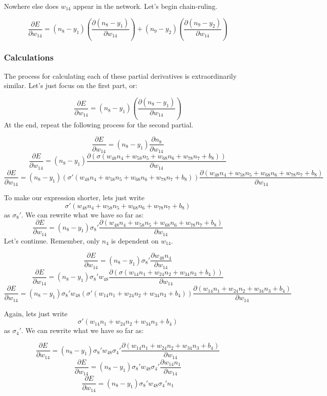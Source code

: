 \documentclass{article}
\begin{document}
Nowhere else does $w_{14}$ appear in the network. Let's begin chain-ruling.

\[\dfrac{\partial E}{\partial w_{14}} = (n_8-y_1)\left(\frac{\partial{(n_8-y_1)}}{\partial w_{14}}\right)+(n_9-y_2)\left(\frac{\partial{(n_9-y_2)}}{\partial w_{14}}\right)\]

\subsubsection{Calculations}

The process for calculating each of these partial derivatives is extraordinarily similar. Let's just focus on the first part, or:

\[\dfrac{\partial E}{\partial w_{14}} = (n_8-y_1)\left(\frac{\partial{(n_8-y_1)}}{\partial w_{14}}\right)\]
At the end, repeat the following process for the second partial.


\[\dfrac{\partial E}{\partial w_{14}} = (n_8-y_1)\frac{\partial{n_8}}{\partial w_{14}}\]
\[\dfrac{\partial E}{\partial w_{14}} = (n_8-y_1)\frac{\partial{(\sigma(w_{48}n_4 + w_{58}n_5 + w_{68}n_6 + w_{78}n_7 + b_8))}}{\partial w_{14}}\]
\[\dfrac{\partial E}{\partial w_{14}} = (n_8-y_1)\left(\sigma'(w_{48}n_4 + w_{58}n_5 + w_{68}n_6 + w_{78}n_7 + b_8)\right)\frac{\partial{(w_{48}n_4 + w_{58}n_5 + w_{68}n_6 + w_{78}n_7 + b_8)}}{\partial w_{14}}\]

To make our expression shorter, lets just write
\[\sigma'(w_{48}n_4 + w_{58}n_5 + w_{68}n_6 + w_{78}n_7 + b_8)\]
as $\sigma_8'$. We can rewrite what we have so far as:
\[\dfrac{\partial E}{\partial w_{14}} = (n_8-y_1)\sigma_8'\frac{\partial{(w_{48}n_4 + w_{58}n_5 + w_{68}n_6 + w_{78}n_7 + b_8)}}{\partial w_{14}}\]
Let's continue. Remember, only $n_4$ is dependent on $w_{14}$.

\[\dfrac{\partial E}{\partial w_{14}} = (n_8-y_1)\sigma_8'\frac{\partial{w_{48}n_4}}{\partial w_{14}}\]
\[\dfrac{\partial E}{\partial w_{14}} = (n_8-y_1)\sigma_8'w_{48}\frac{\partial{(\sigma(w_{14}n_1 + w_{24}n_2 + w_{34}n_3 + b_4))}}{\partial w_{14}}\]
\[\dfrac{\partial E}{\partial w_{14}} = (n_8-y_1)\sigma_8'w_{48}(\sigma'(w_{14}n_1 + w_{24}n_2 + w_{34}n_3 + b_4))\frac{\partial{(w_{14}n_1 + w_{24}n_2 + w_{34}n_3 +b_4)}}{\partial w_{14}}\]

Again, lets just write
\[\sigma'(w_{14}n_1 + w_{24}n_2 + w_{34}n_3 + b_4)\]
as $\sigma_4'$. We can rewrite what we have so far as:

\[\dfrac{\partial E}{\partial w_{14}} = (n_8-y_1)\sigma_8'w_{48}\sigma_4'\frac{\partial{(w_{14}n_1 + w_{24}n_2 + w_{34}n_3 + b_4)}}{\partial w_{14}}\]
\[\dfrac{\partial E}{\partial w_{14}} = (n_8-y_1)\sigma_8'w_{48}\sigma_4'\frac{\partial{w_{14}n_1}}{\partial w_{14}}\]
\[\dfrac{\partial E}{\partial w_{14}} = (n_8-y_1)\sigma_8'w_{48}\sigma_4'n_1\]
\end{document}
